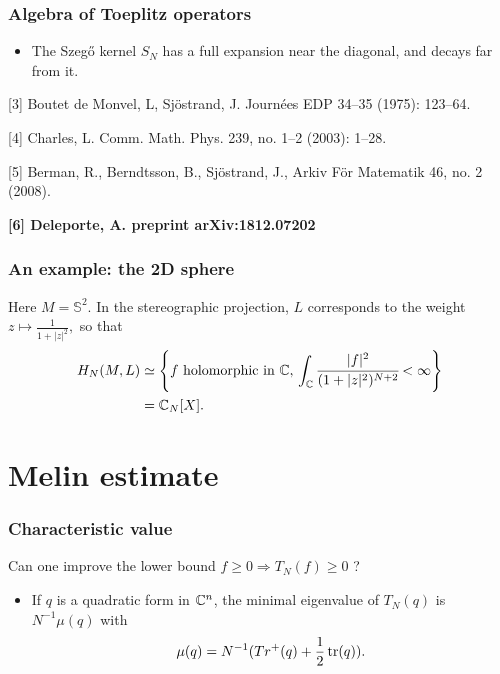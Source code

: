 \documentclass[mathserif]{beamer}
\begin{document}
\begin{frame}
  \frametitle{Algebra of Toeplitz operators}
  \begin{itemize}
  \item The Szeg\H{o} kernel $S_N$ has a full expansion near the
    diagonal, and decays far from it.
  \end{itemize}
\vspace{2em}

\small{[3] Boutet de Monvel, L, Sjöstrand, J. Journées EDP 34–35 (1975): 123–64.

[4] Charles, L. Comm. Math. Phys. 239, no. 1–2 (2003): 1–28.

[5] Berman, R., Berndtsson, B., Sjöstrand, J.,  Arkiv För Matematik
46, no. 2 (2008).

{\bf [6] Deleporte, A. preprint arXiv:1812.07202}
}

 

\end{frame}

\begin{frame}
  \frametitle{An example: the 2D sphere}
  Here $M=\mathbb{S}^2$. In the stereographic projection, $L$
  corresponds to the weight $z\mapsto \frac{1}{1+|z|^2},$ so
  that \begin{align*}H_N(M,L)&\simeq \left\{f\text{ holomorphic in
                               $\mathbb{C}$},\,\int_{\mathbb{C}}\cfrac{|f|^2}{(1+|z|^2)^{N+2}}<\infty\right\}\\
                             &=\mathbb{C}_N[X].\end{align*}
\end{frame}



\section{Melin estimate}
\begin{frame}
  \frametitle{Characteristic value}
  Can one improve the lower bound $f\geq 0\Rightarrow T_N(f)\geq 0$ ?
  \begin{itemize}
  \item If $q$ is a quadratic form in $\mathbb{C}^n$, the minimal eigenvalue
    of $T_N(q)$ is $N^{-1}\mu(q)$ with $$\mu(q)=N^{-1}(Tr^+(q)+\frac
    12 \operatorname{tr}(q)).$$

\end{itemize}
\end{frame}
\end{document}
